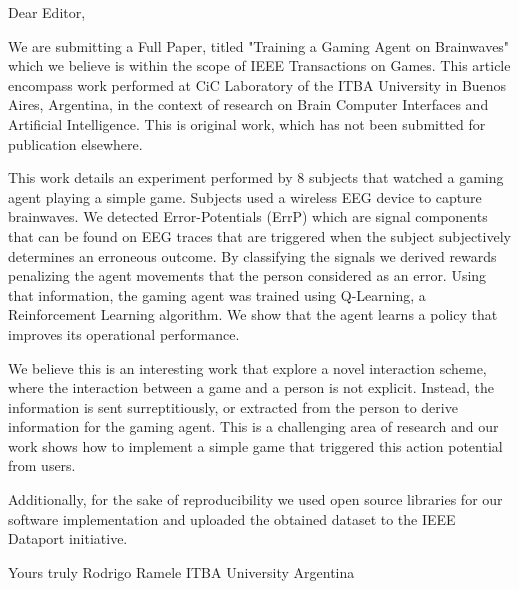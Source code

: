 Dear Editor, 

We are submitting a Full Paper, titled "Training a Gaming Agent on Brainwaves" which we believe is within the scope of IEEE Transactions on Games.  This article encompass work performed at CiC Laboratory of the ITBA University in Buenos Aires, Argentina, in the context of research on Brain Computer Interfaces and Artificial Intelligence.  This is original work, which has not been submitted for publication elsewhere.

This work details an experiment performed by 8 subjects that watched a gaming agent playing a simple game. Subjects used a wireless EEG device to capture brainwaves.  We detected Error-Potentials (ErrP) which are signal components that can be found on EEG traces that are triggered when the subject subjectively determines an erroneous outcome.  By classifying the signals we derived rewards penalizing the agent movements that the person considered as an error.  Using that information, the gaming agent was trained using Q-Learning, a Reinforcement Learning algorithm.  We show that the agent learns a policy that improves its operational performance.

We believe this is an interesting work that explore a novel interaction scheme, where the interaction between a game and a person is not explicit.  Instead, the information is sent surreptitiously, or extracted from the person to derive information for the gaming agent.  This is a challenging area of research and our work shows how to implement a simple game that triggered this action potential from users.

Additionally, for the sake of reproducibility we used open source libraries for our software implementation and uploaded the obtained dataset to the IEEE Dataport initiative. 

Yours truly
Rodrigo Ramele
ITBA University 
Argentina